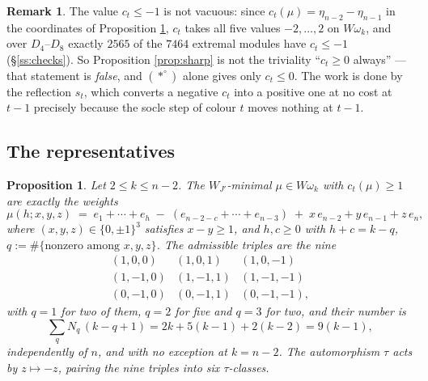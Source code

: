 \documentclass[reqno]{amsart}
\theoremstyle{plain}
\newtheorem{proposition}[theorem]{Proposition}
\theoremstyle{definition}
\newtheorem{remark}[theorem]{Remark}
\newcommand{\om}{\omega}
\begin{document}
\begin{remark}
The value $c_t\le-1$ is not vacuous: since
$c_t(\mu)=\eta_{n-2}-\eta_{n-1}$ in the coordinates of Proposition
\ref{prop:reps}, $c_t$ takes all five values $-2,\dots,2$ on $W\om_k$, and over
$D_4$--$D_8$ exactly $2565$ of the $7464$ extremal modules have $c_t\le-1$
(\S\ref{ss:checks}).  So Proposition \ref{prop:sharp} is not the triviality
``$c_t\ge0$ always'' --- that statement is \emph{false}, and $(*^\circ)$ alone
gives only $c_t\le0$.  The work is done by the reflection $s_t$,
which converts a negative $c_t$ into a positive one at no cost at $t-1$
precisely because the socle step of colour $t$ moves nothing at $t-1$.
\end{remark}

\subsection{The representatives}

\begin{proposition}\label{prop:reps}
Let $2\le k\le n-2$.  The $W_{J'}$-minimal $\mu\in W\om_k$ with $c_t(\mu)\ge1$
are exactly the weights
\begin{equation}\label{eq:reps}
   \mu(h;x,y,z)\;=\;e_1+\cdots+e_h\;-\;(e_{n-2-c}+\cdots+e_{n-3})
   \;+\;x\,e_{n-2}+y\,e_{n-1}+z\,e_n,
\end{equation}
where $(x,y,z)\in\{0,\pm1\}^3$ satisfies $x-y\ge1$, and $h,c\ge0$ with
$h+c=k-q$, $q:=\#\{\text{nonzero among }x,y,z\}$.  The admissible triples are
the nine
\[
\begin{array}{ccc}
(1,0,0) & (1,0,1) & (1,0,-1)\\
(1,-1,0) & (1,-1,1) & (1,-1,-1)\\
(0,-1,0) & (0,-1,1) & (0,-1,-1),
\end{array}
\]
with $q=1$ for two of them, $q=2$ for five and $q=3$ for two, and their number
is
\[
   \sum_q N_q\,(k-q+1)=2k+5(k-1)+2(k-2)=9(k-1),
\]
\emph{independently of $n$}, and with no exception at $k=n-2$.  The automorphism
$\tau$ acts by $z\mapsto-z$, pairing the nine triples into six $\tau$-classes.
\end{proposition}
\end{document}
